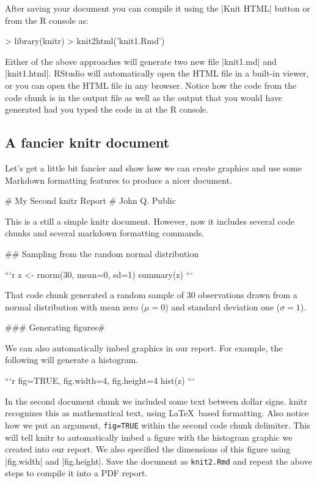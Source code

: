 After saving your document you can compile it using the |Knit HTML| button or from the R console as:
\begin{R}
> library(knitr)
> knit2html('knit1.Rmd')
\end{R}
%
Either of the above approaches will generate two new file |knit1.md| and |knit1.html|. RStudio will automatically open the HTML file in a built-in viewer, or you can open the HTML file in any browser. Notice how the code from the code chunk is in the output file as well as the output that you would have generated had you typed the code in at the R console.


\subsection{A fancier knitr document}

Let's get a little bit fancier and show how we can create graphics and
use some Markdown formatting features to produce a nicer document.
%
\begin{codeblock}
# My Second knitr Report
# John Q. Public

This is a still a simple knitr document. However,
now it includes several code chunks and several
markdown formatting commands.

## Sampling from the random normal distribution

```{r}
z <- rnorm(30, mean=0, sd=1)
summary(z)
```

That code chunk generated a random sample of 30
observations drawn from a normal distribution with mean
zero ($\mu = 0$) and standard deviation one ($\sigma = 1$).


### Generating figures#

We can also automatically imbed graphics in our
report. For example, the following will generate
a histogram.

```{r fig=TRUE, fig.width=4, fig.height=4}
hist(z)
```
\end{codeblock}

In the second document chunk we included some text between dollar signs.  knitr recognizes this as mathematical text, using \LaTeX\ based formatting. Also notice how we put an argument, \lstinline!fig=TRUE! within the second
code chunk delimiter. This will tell knitr to automatically imbed a
figure with the histogram graphic we created into our report.  We also specified the dimensions of this figure using |fig.width| and |fig.height|.  Save the document
as \lstinline!knit2.Rmd! and repeat the above steps to compile it into
a PDF report.


